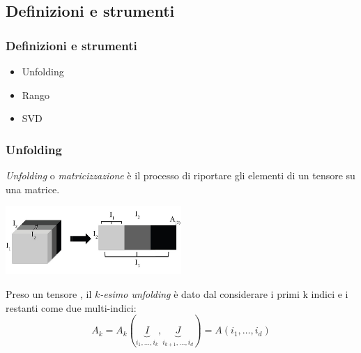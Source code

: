 \documentclass[compress]{beamer}
\theoremstyle{definition}
\theoremstyle{plain}
\begin{document}
\subsection{Definizioni e strumenti}
\begin{frame}
\frametitle{Definizioni e strumenti}
\begin{itemize}
\item Unfolding
\item Rango
\item SVD
\end{itemize}
\end{frame}





\begin{frame}
\frametitle{Unfolding}
\emph{Unfolding} o \emph{matricizzazione} è il processo di riportare gli elementi di un tensore su una matrice.

\begin{center}
	\includegraphics[width=0.5\textwidth]{Img/unfolding.jpg}
\end{center}

\pause
Preso un tensore \A, il \emph{$k$-esimo unfolding} è dato dal considerare i primi k indici e i restanti come due multi-indici:
\begin{equation*}
	A_k = A_k(
	\underbrace{I}_{i_1,\dots,i_k}
	,
	\underbrace{J}_{i_{k+1},\dots,i_d}
	) = A(i_1,\dots,i_d)	
\end{equation*}
\end{frame}
\end{document}
